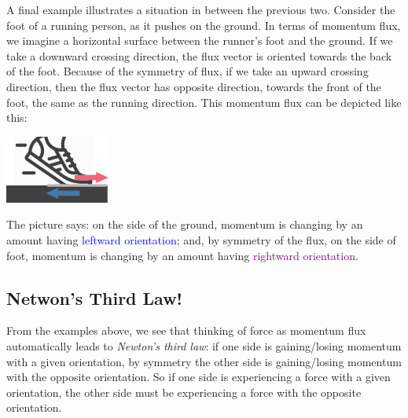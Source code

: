 \documentclass[a4paper,12pt,%
onecolumn,oneside,titlepage,%
british%
]{memoir}
\newcommand{\langnohyph}[1]{\begin{hyphenrules}{nohyphenation}#1\end{hyphenrules}}
\newcommand*{\amp}{\&}
\renewcommand*{\|}[1][]{\nonscript\:#1\vert\nonscript\:\mathopen{}}
\begin{document}
\smallskip

A final example illustrates a situation in between the previous two. Consider the foot of a running person, as it pushes on the ground. In terms of momentum flux,
we imagine a horizontal surface between the runner's foot and the ground. If we take a downward crossing direction, the flux vector is oriented towards the back of the foot. Because of the symmetry of flux, if we take an upward crossing direction, then the flux vector has opposite direction, towards the front of the foot, the same as the running direction. This momentum flux can be depicted like this:\noprelistbreak
\begin{center}
  \medskip
  \includegraphics[height=6em]{foot_shear_flux.pdf}
\end{center}
The picture says: on the side of the ground, momentum is changing by an amount having \textcolor{blue}{leftward orientation}; and, by symmetry of the flux, on the side of foot, momentum is changing by an amount having \textcolor{purple}{rightward orientation}.


\subsection{Netwon's Third Law!}
\label{sec:newton_3rd}

%
%
From the examples above, we see that thinking of force as momentum flux automatically leads to \emph{Newton's third law}:
if one side is gaining/losing momentum with a given orientation, by symmetry the other side is gaining/losing momentum with the opposite orientation. So if one side is experiencing a force with a given orientation, the other side must be experiencing a force with the opposite orientation.
\end{document}
